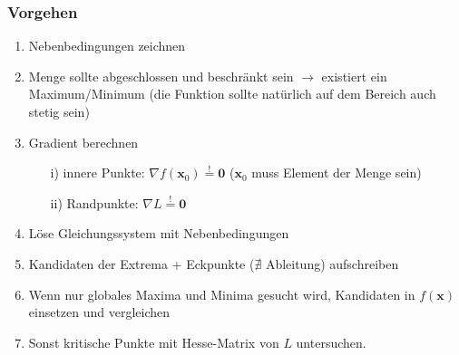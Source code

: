 \documentclass[a3paper, 11pt, landscape]{scrartcl}
\begin{document}
\begin{multicols*}{3}
				\subsubsection{Vorgehen}
					\begin{enumerate}
						\item Nebenbedingungen zeichnen
						\item Menge sollte abgeschlossen und beschränkt sein $\rightarrow$ existiert ein Maximum/Minimum (die Funktion sollte natürlich auf dem Bereich auch stetig sein)
						\item Gradient berechnen
						\begin{itemize}
							\item[i)] innere Punkte: $\nabla f(\textbf{x}_0)\overset{!}{=} \textbf{0}$ ($\textbf{x}_0$ muss Element der Menge sein)
							\item[ii)] Randpunkte: $\nabla L\overset{!}{=} \textbf{0}$ 
						\end{itemize}
						\item Löse Gleichungssystem mit Nebenbedingungen
						\item Kandidaten der Extrema + Eckpunkte ($\nexists$ Ableitung) aufschreiben
						\item Wenn nur globales Maxima und Minima gesucht wird, Kandidaten in $f(\textbf{x})$ einsetzen und vergleichen
					    \item Sonst kritische Punkte mit Hesse-Matrix von $L$ untersuchen.
						
					\end{enumerate}
					

\end{multicols*}
\end{document}
